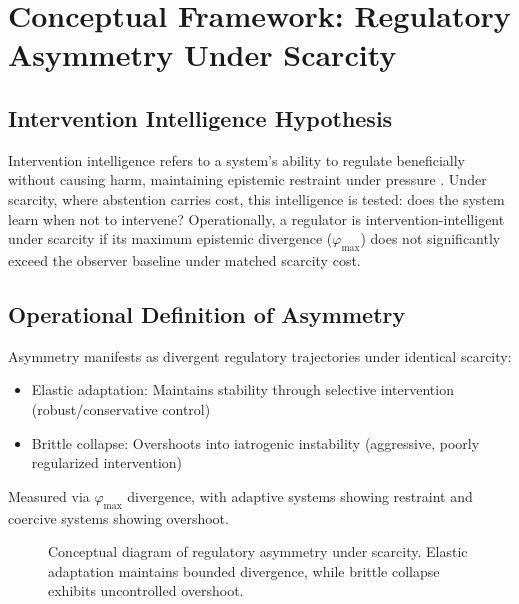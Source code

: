 \documentclass[12pt,a4paper]{article}
\theoremstyle{plain}
\theoremstyle{definition}
\theoremstyle{remark}
\begin{document}
\section{Conceptual Framework: Regulatory Asymmetry Under Scarcity}

\subsection{Intervention Intelligence Hypothesis}

Intervention intelligence refers to a system's ability to regulate beneficially without causing harm, maintaining epistemic restraint under pressure \cite{Cragin2026Thesis}. Under scarcity, where abstention carries cost, this intelligence is tested: does the system learn when not to intervene?
Operationally, a regulator is intervention-intelligent under scarcity if its maximum epistemic divergence ($\varphi_{\max}$) does not significantly exceed the observer baseline under matched scarcity cost.

\subsection{Operational Definition of Asymmetry}

Asymmetry manifests as divergent regulatory trajectories under identical scarcity:
\begin{itemize}
\item Elastic adaptation: Maintains stability through selective intervention (robust/conservative control)
\item Brittle collapse: Overshoots into iatrogenic instability (aggressive, poorly regularized intervention)
\end{itemize}

Measured via $\varphi_{\max}$ divergence, with adaptive systems showing restraint 
and coercive systems showing overshoot.

\begin{figure}[H]
\centering
{}
\caption{Conceptual diagram of regulatory asymmetry under scarcity. Elastic adaptation maintains bounded divergence, while brittle collapse exhibits uncontrolled overshoot.}
\label{fig:asymmetry}
\end{figure}
\end{document}
